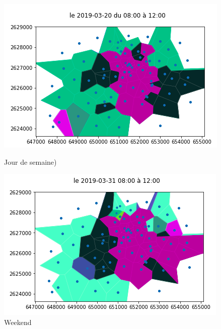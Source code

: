 \documentclass{report}
\begin{document}
\begin{figure}[H]
  \begin{minipage}{0.4\textwidth}
    \centering
    \includegraphics[scale=0.55]{images/S8_12.png}
    \caption{Jour de semaine)}\label{Fig:Data1}
  \end{minipage}\hfill
  \begin{minipage}{0.4\textwidth}
    \centering
    \includegraphics[scale=0.55]{images/W8_12.png}
    \caption{Weekend}\label{Fig:Data2}
  \end{minipage}
\end{figure} 
\end{document}
